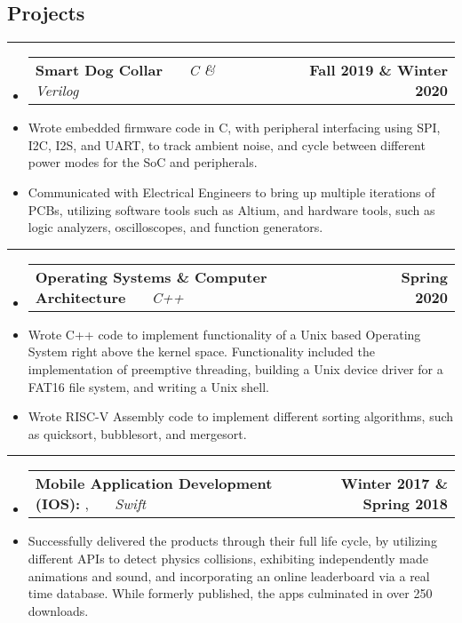 \documentclass[10pt,letterpaper]{article}
\makeatletter
\newcommand{\header}[2]
{
	\begin{tabular*}{\linewidth}{l @{\extracolsep{\fill}} r}
		\hspace{-27pt} #1 & #2 \\
	\end{tabular*}
}
\newcommand{\sectionbreak}
{
	\vspace{-1.2em}
	\rule{\textwidth}{1.7pt}
	\vspace{-1.7em}
}
\makeatother
\begin{document}
\vspace{-1.5em}

\subsection*{Projects}
\sectionbreak


\begin{itemize}
	\item[]
		\header
		{
			\textbf{Smart Dog Collar}
			\emph{\smash{Senior Design Project}} \ \ \ \footnotesize \emph{C \& Verilog}
		}
			{\textbf{Fall 2019 \& Winter 2020}}
		\item 
			Wrote embedded firmware code in C, with peripheral interfacing using SPI, I2C, I2S, and UART, to track ambient noise, and cycle between different power modes for the SoC and peripherals.
		\item 
			Communicated with Electrical Engineers to bring up multiple iterations of PCBs, utilizing software tools such as Altium, and hardware tools, such as logic analyzers, oscilloscopes, and function generators.

\end{itemize}

\hrule

\begin{itemize}
	\item[]
		\header
		{
			\textbf{Operating Systems \& Computer Architecture}
			\emph{\smash{Relevant Course Projects}} \ \ \ \footnotesize \emph{C++}
		}
			{\textbf{Spring 2020}}
		\item 
			Wrote C++ code to implement functionality of a Unix based Operating System right above the kernel space. Functionality included the implementation of preemptive threading, building a Unix device driver for a FAT16 file system, and writing a Unix shell.
		\item 
			Wrote RISC-V Assembly code to implement different sorting algorithms, such as quicksort, bubblesort, and mergesort. 

\end{itemize}
\hrule
\begin{itemize}
	\item[]
		\header
		{
			\textbf{Mobile Application Development (IOS): }
			\href{https://appadvice.com/app/round-bound/1369632746}{\emph{\underline{\smash{Round 'a Bound}}}}, 
			\href{https://appadvice.com/app/tic-tac-emoji/1346934986}{\emph{\underline{\smash{Tic-Tac Emoji}}}} \ \ \ \footnotesize  \emph{Swift}
		}
			{\textbf{Winter 2017 \& Spring 2018}}
		\item 
			Successfully delivered the products through their full life cycle, by utilizing different APIs to detect physics collisions, exhibiting independently made animations and sound, and incorporating an online leaderboard via a real time database. While formerly published, the apps culminated in over 250 downloads.
\end{itemize}
\end{document}
